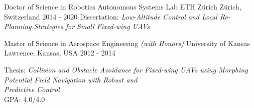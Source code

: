 

\begin{cventries}

  \cveduentry
    {Doctor of Science in Robotics} %
	{Autonomous Systems Lab}
    {ETH Z\"{u}rich} %
    {Z\"{u}rich, Switzerland} %
    {2014 - 2020} %
    {Dissertation: \textit{Low-Altitude Control and Local Re-Planning Strategies for Small Fixed-wing UAVs}}
    
  \cveduentry
    {Master of Science in Aerospace Engineering \textit{(with Honors)}} %
    {}
    {University of Kansas} %
    {Lawrence, Kansas, USA} %
    {2012 - 2014} %
    {\parbox{\linewidth}{\vspace*{0.1cm}
		Thesis: \textit{Collision and Obstacle Avoidance for Fixed-wing UAVs using Morphing Potential Field Navigation with Robust and} \\	
		\hspace*{0.9cm} \textit{Predictive Control} \\
        GPA: 4.0/4.0
        }
    }
    

\end{cventries}
